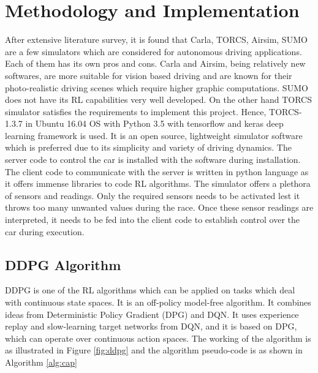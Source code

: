 \chapter{Methodology and Implementation}
\label{ch:SC}
\par After extensive literature survey, it is found that Carla, TORCS, Airsim, SUMO are a few simulators which are considered for autonomous driving applications. Each of them has its own pros and cons. Carla and Airsim, being relatively new softwares, are more suitable for vision based driving and are known for their photo-realistic driving scenes which require higher graphic computations. SUMO does not have its RL capabilities very well developed. On the other hand TORCS simulator satisfies the requirements to implement this project. Hence, TORCS-1.3.7 in Ubuntu 16.04 OS with Python 3.5 with tensorflow and keras deep learning framework is used.
It is an open source, lightweight simulator software which is preferred due to its simplicity and variety of driving dynamics.
The server code to control the car is installed with the software during installation. The client code to communicate with the server is written in python language as it offers immense libraries to code RL algorithms. The simulator offers a plethora of sensors and readings. Only the required sensors needs to be activated lest it throws too many unwanted values during the race. Once these sensor readings are interpreted, it needs to be fed into the client code to establish control over the car during execution. \\



\section{DDPG Algorithm}

DDPG is one of the RL algorithms which can be applied on tasks which deal with continuous state spaces. It is an off-policy model-free algorithm. It combines ideas from Deterministic Policy Gradient (DPG) and DQN. It uses experience replay and slow-learning target networks from DQN, and it is based on DPG, which can operate over continuous action spaces. The working of the algorithm is as illustrated in Figure \ref{fig:ddpg} and the algorithm pseudo-code is as shown in Algorithm \ref{alg:cap}\\

